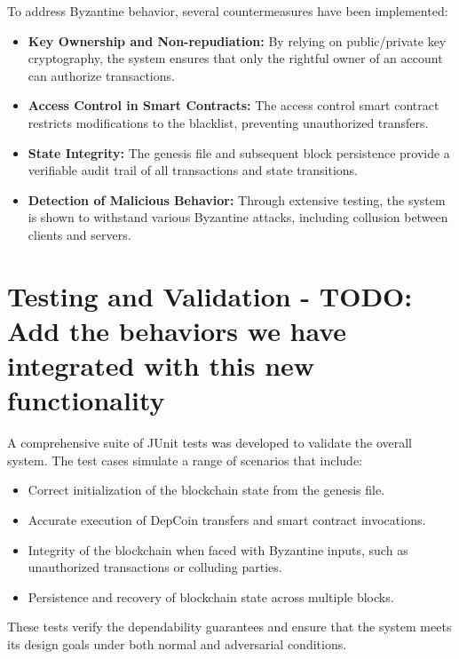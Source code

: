 \documentclass[runningheads]{llncs}
\begin{document}
To address Byzantine behavior, several countermeasures have been implemented:
\begin{itemize}
    \item \textbf{Key Ownership and Non-repudiation:} By relying on public/private key cryptography, the system ensures that only the rightful owner of an account can authorize transactions.
    \item \textbf{Access Control in Smart Contracts:} The access control smart contract restricts modifications to the blacklist, preventing unauthorized transfers.
    \item \textbf{State Integrity:} The genesis file and subsequent block persistence provide a verifiable audit trail of all transactions and state transitions.
    \item \textbf{Detection of Malicious Behavior:} Through extensive testing, the system is shown to withstand various Byzantine attacks, including collusion between clients and servers.
\end{itemize}

\section{Testing and Validation - TODO: Add the behaviors we have integrated with this new functionality}
A comprehensive suite of JUnit tests was developed to validate the overall system. The test cases simulate a range of scenarios that include:
\begin{itemize}
    \item Correct initialization of the blockchain state from the genesis file.
    \item Accurate execution of DepCoin transfers and smart contract invocations.
    \item Integrity of the blockchain when faced with Byzantine inputs, such as unauthorized transactions or colluding parties.
    \item Persistence and recovery of blockchain state across multiple blocks.
\end{itemize}
These tests verify the dependability guarantees and ensure that the system meets its design goals under both normal and adversarial conditions.
\end{document}
